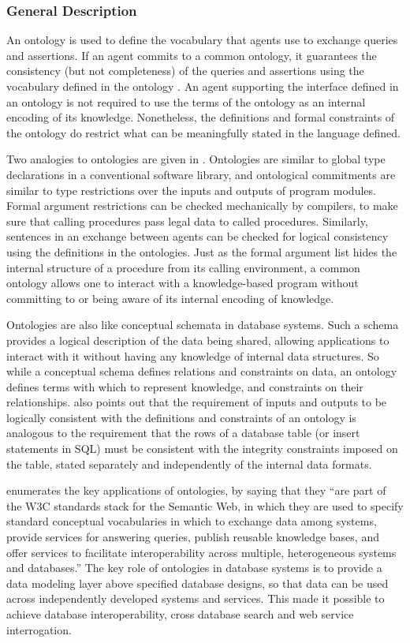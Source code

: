\subsubsection{General Description}
An ontology is used to define the vocabulary that agents use to exchange
queries and assertions. If an agent commits to a common ontology, it
guarantees the consistency (but not completeness) of the queries and
assertions using the vocabulary defined in the ontology \cite{gruber93towards}.
An agent supporting the interface defined in an ontology is not
required to use the terms of the ontology as an internal encoding of
its knowledge. Nonetheless, the definitions and formal constraints of
the ontology do restrict what can be meaningfully stated in the
language defined. 

Two analogies to ontologies are given in \cite{gruber93towards}. Ontologies are
similar to global type declarations in a conventional software library,
and ontological commitments are similar to type restrictions over the
inputs and outputs of program modules. Formal argument restrictions can
be checked mechanically by compilers, to make sure that calling
procedures pass legal data to called procedures. Similarly, sentences
in an exchange between agents can be checked for logical consistency
using the definitions in the ontologies. Just as the formal argument
list hides the internal structure of a procedure from its calling
environment, a common ontology allows one to interact with a
knowledge-based program without committing to or being aware of its
internal encoding of knowledge. 

Ontologies are also like conceptual schemata in database systems. Such a
schema provides a logical description of the data being shared,
allowing applications to interact with it without having any knowledge
of internal data structures. So while a conceptual schema defines
relations and constraints on data, an ontology defines terms with which
to represent knowledge, and constraints on their relationships.
\cite{gruber2008ontology} also points out that the requirement of inputs and
outputs to be logically consistent with the definitions and constraints
of an ontology is analogous to the requirement that the rows of a
database table (or insert statements in SQL) must be consistent with
the integrity constraints imposed on the table, stated separately and
independently of the internal data formats. 

\cite{gruber2008ontology} enumerates the key applications of ontologies, by saying
that they {\textquotedblleft}are part of the W3C standards stack for
the Semantic Web, in which they are used to specify standard conceptual
vocabularies in which to exchange data among systems, provide services
for answering queries, publish reusable knowledge bases, and offer
services to facilitate interoperability across multiple, heterogeneous
systems and databases.{\textquotedblright} The key role of ontologies
in database systems is to provide a data modeling layer above specified
database designs, so that data can be used across independently
developed systems and services. This made it possible to achieve
database interoperability, cross database search and web service
interrogation. 

